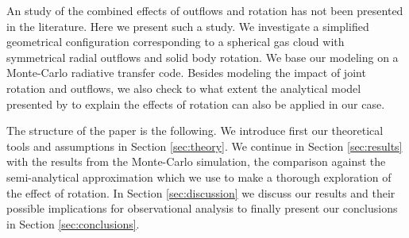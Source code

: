 \documentclass[a4paper,fleqn,usenatbib]{mnras}
\begin{document}
An study of the combined effects of outflows and rotation has not been
presented in the literature.
Here we present such a study. 
We investigate a simplified geometrical configuration corresponding to a
spherical gas cloud with symmetrical radial outflows and solid body
rotation. 
We base our modeling on a Monte-Carlo radiative transfer code.
Besides modeling the impact of joint rotation and outflows, we also
check to what extent the analytical model presented by
\cite{Garavito14} to explain the effects of rotation can also be
applied in our case.

The structure of the paper is the following.
We introduce first our theoretical tools and assumptions
in Section \ref{sec:theory}. We continue in Section \ref{sec:results}
with the results from the Monte-Carlo simulation, the comparison
against the semi-analytical approximation which we use to make a
thorough exploration of the effect of rotation.
In Section \ref{sec:discussion} we discuss our results and their
possible implications for observational analysis to finally present
our conclusions in Section \ref{sec:conclusions}.
\end{document}
